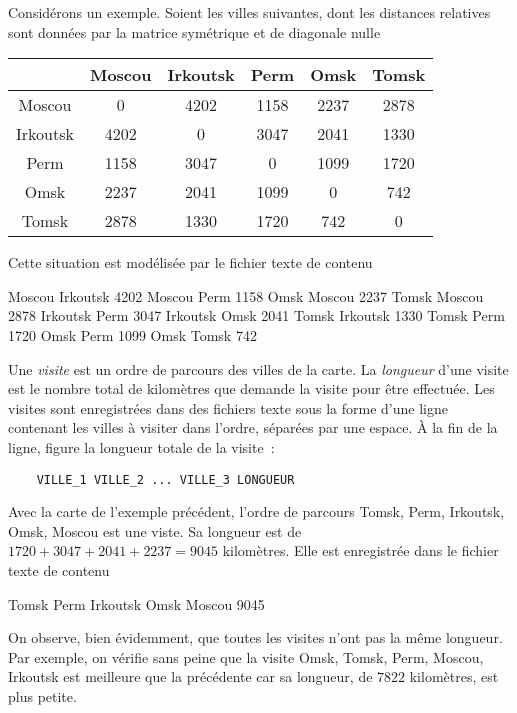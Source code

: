 \documentclass[12pt]{article}
\theoremstyle{definition}
\begin{document}
Considérons un exemple. Soient les villes suivantes, dont les distances
relatives sont données par la matrice symétrique et de diagonale nulle
\begin{center}
    \begin{tabular}{c|ccccc}
                 & Moscou & Irkoutsk & Perm & Omsk & Tomsk \\ \hline
        Moscou   & 0      & 4202     & 1158 & 2237 & 2878 \\
        Irkoutsk & 4202   & 0        & 3047 & 2041 & 1330 \\
        Perm     & 1158   & 3047     & 0    & 1099 & 1720 \\
        Omsk     & 2237   & 2041     & 1099 & 0    & 742 \\
        Tomsk    & 2878   & 1330     & 1720 & 742  & 0
    \end{tabular}
\end{center}
Cette situation est modélisée par le fichier texte de contenu
\begin{center} \small
\begin{boxedverbatim}
Moscou Irkoutsk 4202
Moscou Perm 1158
Omsk Moscou 2237
Tomsk Moscou 2878
Irkoutsk Perm 3047
Irkoutsk Omsk 2041
Tomsk Irkoutsk 1330
Tomsk Perm 1720
Omsk Perm 1099
Omsk Tomsk 742
\end{boxedverbatim}
\end{center}
\medskip

Une {\em visite} est un ordre de parcours des villes de la carte. La
{\em longueur} d'une visite est le nombre total de kilomètres que
demande la visite pour être effectuée. Les visites sont enregistrées
dans des fichiers texte sous la forme d'une ligne contenant les villes à
visiter dans l'ordre, séparées par une espace. À la fin de la ligne,
figure la longueur totale de la visite~:
\begin{verbatim}
    VILLE_1 VILLE_2 ... VILLE_3 LONGUEUR
\end{verbatim}
\medskip

Avec la carte de l'exemple précédent, l'ordre de parcours Tomsk, Perm,
Irkoutsk, Omsk, Moscou  est une viste. Sa longueur est de
$1720 + 3047 + 2041 + 2237 = 9045$ kilomètres. Elle est enregistrée dans
le fichier texte de contenu
\begin{center} \small
\begin{boxedverbatim}
Tomsk Perm Irkoutsk Omsk Moscou 9045
\end{boxedverbatim}
\end{center}
On observe, bien évidemment, que toutes les visites n'ont pas la même
longueur. Par exemple, on vérifie sans peine que la visite Omsk, Tomsk,
Perm, Moscou, Irkoutsk est meilleure que la précédente car sa longueur,
de $7822$ kilomètres, est plus petite.
\medskip
\end{document}
